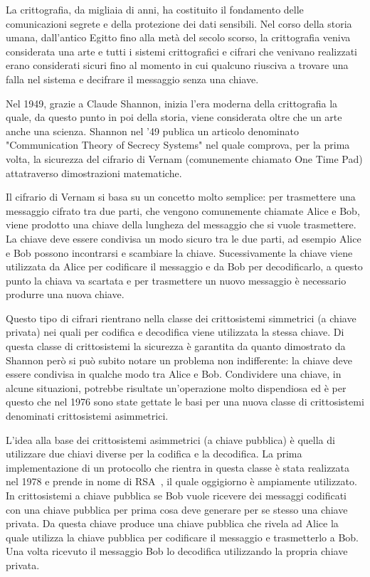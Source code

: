 La crittografia, da migliaia di anni, ha costituito il fondamento delle comunicazioni segrete e della protezione dei dati sensibili. 
Nel corso della storia umana, dall'antico Egitto fino alla met\`a del secolo scorso, la crittografia veniva considerata una arte e tutti i sistemi crittografici e cifrari che venivano realizzati erano considerati sicuri fino al momento in cui qualcuno riusciva a trovare una falla nel sistema e decifrare il messaggio senza una chiave.

Nel 1949, grazie a Claude Shannon, inizia l'era moderna della crittografia la quale, da questo punto in poi della storia, viene considerata oltre che un arte anche una scienza. Shannon nel '49 publica un articolo denominato "Communication Theory of Secrecy Systems"\cite{6769090} nel quale comprova, per la prima volta, la sicurezza del cifrario di Vernam (comunemente chiamato One Time Pad) attatraverso dimostrazioni matematiche.

Il cifrario di Vernam si basa su un concetto molto semplice: per trasmettere una messaggio cifrato tra due parti, che vengono comunemente chiamate Alice e Bob, viene prodotto una chiave della lungheza del messaggio che si vuole trasmettere. La chiave deve essere condivisa un modo sicuro tra le due parti, ad esempio Alice e Bob possono incontrarsi e scambiare la chiave. Sucessivamente la chiave viene utilizzata da Alice per codificare il messaggio e da Bob per decodificarlo, a questo punto la chiava va scartata e per trasmettere un nuovo messaggio \`e necessario produrre una nuova chiave. 

Questo tipo di cifrari rientrano nella classe dei crittosistemi simmetrici (a chiave privata) nei quali per codifica e decodifica viene utilizzata la stessa chiave. Di questa classe di crittosistemi la sicurezza \`e garantita da quanto dimostrato da Shannon per\`o si pu\`o subito notare un problema non indifferente: la chiave deve essere condivisa in qualche modo tra Alice e Bob. Condividere una chiave, in alcune situazioni, potrebbe risultate un'operazione molto dispendiosa ed \`e per questo che nel 1976 sono state gettate le basi per una nuova classe di crittosistemi denominati crittosistemi asimmetrici\cite{1055638}.

L'idea alla base dei crittosistemi asimmetrici (a chiave pubblica) \`e quella di utilizzare due chiavi diverse per la codifica e la decodifica. La prima implementazione di un protocollo che rientra in questa classe \`e stata realizzata nel 1978 e prende in nome di RSA~\cite{rivest1978method}, il quale oggigiorno \`e ampiamente utilizzato. In crittosistemi a chiave pubblica se Bob vuole ricevere dei messaggi codificati con una chiave pubblica per prima cosa deve generare per se stesso una chiave privata. Da questa chiave produce una chiave pubblica che rivela ad Alice la quale utilizza la chiave pubblica per codificare il messaggio e trasmetterlo a Bob. Una volta ricevuto il messaggio Bob lo decodifica utilizzando la propria chiave privata.

